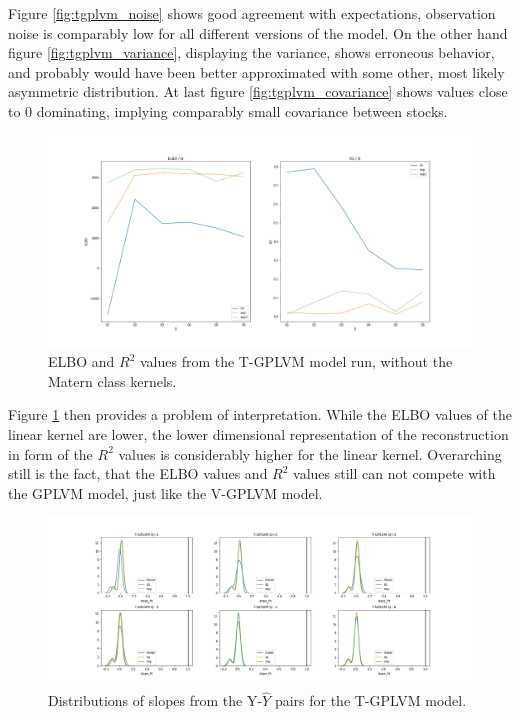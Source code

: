 Figure \ref{fig:tgplvm_noise} shows good agreement with expectations, observation noise is comparably low for all different versions of the model. On the other hand figure \ref{fig:tgplvm_variance}, displaying the variance, shows erroneous behavior, and probably would have been better approximated with some other, most likely asymmetric distribution. At last figure \ref{fig:tgplvm_covariance} shows values close to 0 dominating, implying comparably small covariance between stocks.
\begin{figure}[b]
	\centering
	\includegraphics[width=7in]{img/07_3/modelTIME_Qs.png}
	\caption[T-GPLVM ELBO and $R^2$ results]{ELBO and $R^2$ values from the T-GPLVM model run, without the Matern class kernels.}
	\label{fig:tgplvm_ELBO_R2}
\end{figure}
Figure \ref{fig:tgplvm_ELBO_R2} then provides a problem of interpretation. While the ELBO values of the linear kernel are lower, the lower dimensional representation of the reconstruction in form of the $R^2$ values is considerably higher for the linear kernel. Overarching still is the fact, that the ELBO values and $R^2$ values still can not compete with the GPLVM model, just like the V-GPLVM model. 
\begin{figure}[t]
	\centering
	\includegraphics[width=7in]{img/07_3/slope_fit_time_elbo.png}
	\caption[T-GPLVM slope distributions]{Distributions of slopes from the Y-$\hat{Y}$ pairs for the T-GPLVM model.}
	\label{fig:tgplvm_slopes}
\end{figure}
